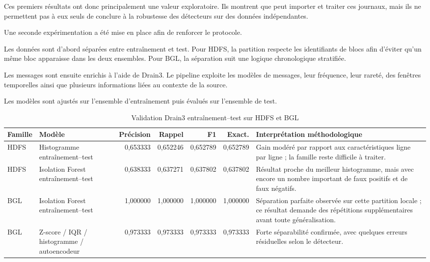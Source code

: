 Ces premiers résultats ont donc principalement une valeur exploratoire. Ils montrent que \logminer{} peut importer et traiter ces journaux, mais ils ne permettent pas à eux seuls de conclure à la robustesse des détecteurs sur des données indépendantes.

Une seconde expérimentation a été mise en place afin de renforcer le protocole.

Les données sont d'abord séparées entre entraînement et test. Pour HDFS, la partition respecte les identifiants de blocs afin d'éviter qu'un même bloc apparaisse dans les deux ensembles. Pour BGL, la séparation suit une logique chronologique stratifiée.

Les messages sont ensuite enrichis à l'aide de Drain3. Le pipeline exploite les modèles de messages, leur fréquence, leur rareté, des fenêtres temporelles ainsi que plusieurs informations liées au contexte de la source.

Les modèles sont ajustés sur l'ensemble d'entraînement puis évalués sur l'ensemble de test.

\begin{table}[H]
\centering
\caption{Validation Drain3 entraînement--test sur HDFS et BGL}
\label{tab:hdfs-bgl-drain3-train-test}
\scriptsize

\begin{tabularx}{\textwidth}{p{2.6cm}p{3.4cm}rrrrX}
\toprule

\textbf{Famille} &
\textbf{Modèle} &
\textbf{Précision} &
\textbf{Rappel} &
\textbf{F1} &
\textbf{Exact.} &
\textbf{Interprétation méthodologique}
\tabularnewline

\midrule

HDFS &
Histogramme entraînement--test &
0,653333 &
0,652246 &
0,652789 &
0,652789 &
Gain modéré par rapport aux caractéristiques ligne par ligne ; la famille reste difficile à traiter.
\tabularnewline

HDFS &
Isolation Forest entraînement--test &
0,638333 &
0,637271 &
0,637802 &
0,637802 &
Résultat proche du meilleur histogramme, mais avec encore un nombre important de faux positifs et de faux négatifs.
\tabularnewline

BGL &
Isolation Forest entraînement--test &
1,000000 &
1,000000 &
1,000000 &
1,000000 &
Séparation parfaite observée sur cette partition locale ; ce résultat demande des répétitions supplémentaires avant toute généralisation.
\tabularnewline

BGL &
Z-score / IQR / histogramme / autoencodeur &
0,973333 &
0,973333 &
0,973333 &
0,973333 &
Forte séparabilité confirmée, avec quelques erreurs résiduelles selon le détecteur.
\tabularnewline

\bottomrule
\end{tabularx}
\end{table}

